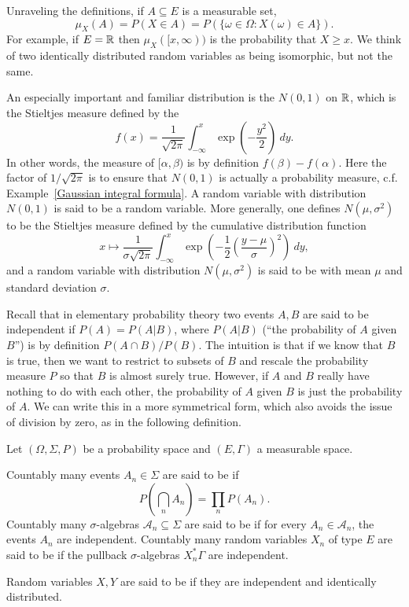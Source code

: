 \begin{subsec}
Unraveling the definitions, if $A \subseteq E$ is a measurable set,
\[\mu_{X}(A) = P(X \in A) = P(\{\omega \in \Omega: X(\omega) \in A\}).\]
For example, if $E = \mathbb{R}$ then $\mu_{X}([x, \infty))$ is the probability that $X \geq x$.
We think of two identically distributed random variables as being isomorphic, but not the same.
\end{subsec}

\begin{example}
An especially important and familiar distribution is the  $N(0, 1)$ on $\mathbb{R}$, which is the Stieltjes measure defined by the 
\[f(x) = \frac{1}{\sqrt{2\pi}} \int_{-\infty}^{x} \exp\left(-\frac{y^{2}}{2}\right) ~dy.\]
In other words, the measure of $[\alpha, \beta)$ is by definition $f(\beta) - f(\alpha)$.
Here the factor of $1/\sqrt{2\pi}$ is to ensure that $N(0, 1)$ is actually a probability measure, c.f. Example~\ref{Gaussian integral formula}.
A random variable with distribution $N(0, 1)$ is said to be a  random variable. More generally, one defines $N(\mu, \sigma^{2})$ to be the Stieltjes measure defined by the cumulative distribution function
\[x \mapsto \frac{1}{\sigma\sqrt{2\pi}} \int_{-\infty}^{x} \exp\left(-\frac{1}{2}{\left(\frac{y - \mu}{\sigma}\right)}^{2}\right) ~dy,\]
and a random variable with distribution $N(\mu, \sigma^{2})$ is said to be  with mean $\mu$ and standard deviation $\sigma$.
\end{example}

\begin{subsec}
Recall that in elementary probability theory two events $A,B$ are said to be independent if $P(A) = P(A|B)$, where $P(A|B)$ (``the probability of $A$ given $B$'') is by definition $P(A \cap B)/P(B)$.
The intuition is that if we know that $B$ is true, then we want to restrict to subsets of $B$ and rescale the probability measure $P$ so that $B$ is almost surely true.
However, if $A$ and $B$ really have nothing to do with each other, the probability of $A$ given $B$ is just the probability of $A$.
We can write this in a more symmetrical form, which also avoids the issue of division by zero, as in the following definition.
\end{subsec}

\begin{definition}
Let $(\Omega, \Sigma, P)$ be a probability space and $(E, \Gamma)$ a measurable space.

Countably many events $A_{n} \in \Sigma$ are said to be  if
\[P\left(\bigcap_{n} A_{n}\right) = \prod_{n} P(A_{n}).\]
Countably many $\sigma$-algebras $\mathcal A_{n} \subseteq \Sigma$ are said to be  if for every $A_{n} \in \mathcal A_{n}$, the events $A_{n}$ are independent.
Countably many random variables $X_{n}$ of type $E$ are said to be  if the pullback $\sigma$-algebras $X_{n}^{*}\Gamma$ are independent.

Random variables $X,Y$ are said to be  if they are independent and identically distributed.
\end{definition}


